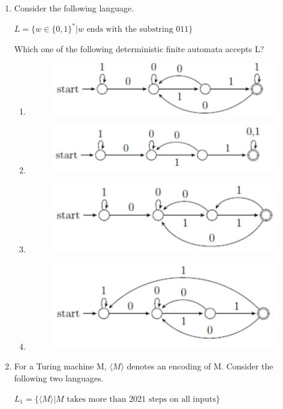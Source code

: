 \documentclass[a4paper, 11pt]{article}
\begin{document}
\begin{enumerate}
    \item Consider the following language.
    
    $L = \{w \in \{0,1\}^* | w \text{ ends with the substring 011}\}$
    
    Which one of the following deterministic finite automata accepts L?
    
    \begin{enumerate}
        \item 
        \begin{figure}[H]
            \centering
            \includegraphics[width=0.3\columnwidth]{figs/q48A.png}
            \label{fig:placeholder}
        \end{figure}
        \item
        \begin{figure}[H]
            \centering
            \includegraphics[width=0.3\columnwidth]{figs/q48B.png}
            \label{fig:placeholder}
        \end{figure}
        \item
        \begin{figure}[H]
            \centering
            \includegraphics[width=0.3\columnwidth]{figs/q48C.png}
            \label{fig:placeholder}
        \end{figure}
        \item
        \begin{figure}[H]
            \centering
            \includegraphics[width=0.3\columnwidth]{figs/q48D.png}
            \label{fig:placeholder}
        \end{figure}
    \end{enumerate}
    \hfill{}
    
    \item For a Turing machine M, $\langle M \rangle$ denotes an encoding of M. Consider the following two languages.
    \begin{center}
    $L_1 = \{\langle M \rangle | M \text{ takes more than 2021 steps on all inputs}\}$
    

\end{center}
\end{enumerate}
\end{document}
